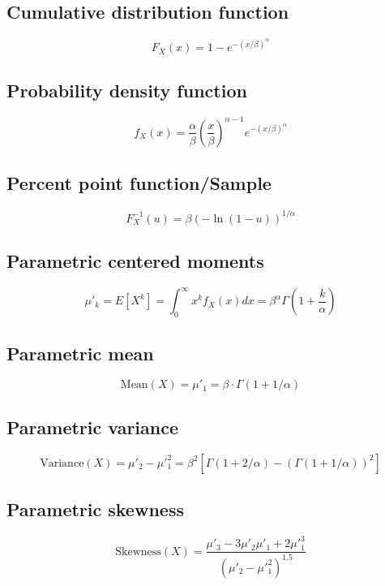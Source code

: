 \documentclass{article}
\begin{document}
\subsection{Cumulative distribution function}
\begin{equation*} F_{X}\left(x\right)=1-e^{-(x/\beta)^\alpha} \end{equation*}
\subsection{Probability density function}
\begin{equation*} f_{X}\left(x\right)=\frac{\alpha}{\beta}\left(\frac{x}{\beta}\right)^{\alpha-1}e^{-(x/\beta)^\alpha} \end{equation*}
\subsection{Percent point function/Sample}
\begin{equation*} F^{-1}_{X}\left(u\right)=\beta(-\ln(1-u))^{1/\alpha} \end{equation*}
\subsection{Parametric centered moments}
\begin{equation*} \mu'_{k}=E[X^k]=\int_{0}^{\infty }x^{k}f_{X}\left(x\right)dx=\beta^\alpha \Gamma\left(1+\frac{k}{\alpha}\right) \end{equation*}
\subsection{Parametric mean}
\begin{equation*} \mathrm{Mean}(X)=\mu'_{1}=\beta\cdot\Gamma(1+1/\alpha) \end{equation*}
\subsection{Parametric variance}
\begin{equation*} \mathrm{Variance}(X)=\mu'_{2}-\mu'^{2}_{1}=\beta^2\left[\Gamma\left(1+2/\alpha\right)-\left(\Gamma\left(1+1/\alpha\right)\right)^2\right] \end{equation*}
\subsection{Parametric skewness}
\begin{equation*} \mathrm{Skewness}(X)=\frac{\mu'_{3}-3\mu'_{2}\mu'_{1}+2\mu'^{3}_{1}}{(\mu'_{2}-\mu'^{2}_{1})^{1.5}} \end{equation*}
\end{document}
